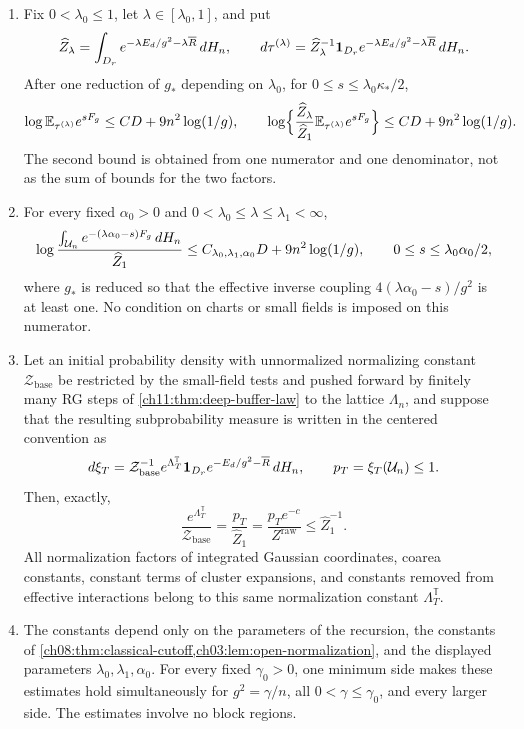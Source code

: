 \begin{theorem}
\begin{enumerate}
\item Fix $0<\lambda_0\le1$, let $\lambda\in[\lambda_0,1]$, and put
\[
 \widehat Z_\lambda=\int_{D_r}e^{-\lambda E_d/g^2-\lambda\overline R}\,dH_n,\qquad
 d\tau^{(\lambda)}=\widehat Z_\lambda^{-1}\mathbf 1_{D_r}e^{-\lambda E_d/g^2-\lambda\overline R}\,dH_n.
\]
After one reduction of $g_*$ depending on $\lambda_0$, for $0\le s\le\lambda_0\kappa_*/2$,
\[
 \log\mathbb E_{\tau^{(\lambda)}}e^{sF_g}\le CD+9n^2\log(1/g),\qquad
 \log\Bigl\{\frac{\widehat Z_\lambda}{\widehat Z_1}\mathbb E_{\tau^{(\lambda)}}e^{sF_g}\Bigr\}\le CD+9n^2\log(1/g).
\]
The second bound is obtained from one numerator and one denominator, not as the sum of bounds for the two factors.
\item For every fixed $\alpha_0>0$ and $0<\lambda_0\le\lambda\le\lambda_1<\infty$,
\[
 \log\frac{\int_{\mathcal U_{n}}e^{-(\lambda\alpha_0-s)F_g}\,dH_n}{\widehat Z_1}
 \le C_{\lambda_0,\lambda_1,\alpha_0}D+9n^2\log(1/g),\qquad0\le s\le\lambda_0\alpha_0/2,
\]
where $g_*$ is reduced so that the effective inverse coupling $4(\lambda\alpha_0-s)/g^2$ is at least one. No condition on charts or small fields is imposed on this numerator.
\item Let an initial probability density with unnormalized normalizing constant $\mathcal Z_{\mathrm{base}}$ be restricted by the small-field tests and pushed forward by finitely many RG steps of \cref{ch11:thm:deep-buffer-law} to the lattice $\Lambda_n$, and suppose that the resulting subprobability measure is written in the centered convention as
\[
 d\xi_T=\mathcal Z_{\mathrm{base}}^{-1}e^{\Lambda_T^{\mathbb T}}\mathbf 1_{D_r}e^{-E_d/g^2-\overline R}\,dH_n,\qquad p_T=\xi_T(\mathcal U_{n})\le1.
\]
Then, exactly,
\[
 \frac{e^{\Lambda_T^{\mathbb T}}}{\mathcal Z_{\mathrm{base}}}=\frac{p_T}{\widehat Z_1}=\frac{p_Te^{-c}}{Z^{\mathrm{raw}}}\le\widehat Z_1^{-1}.
\]
All normalization factors of integrated Gaussian coordinates, coarea constants, constant terms of cluster expansions, and constants removed from effective interactions belong to this same normalization constant $\Lambda_T^{\mathbb T}$.
\item The constants depend only on the parameters of the recursion, the constants of \cref{ch08:thm:classical-cutoff,ch03:lem:open-normalization}, and the displayed parameters $\lambda_0,\lambda_1,\alpha_0$. For every fixed $\gamma_0>0$, one minimum side makes these estimates hold simultaneously for $g^2=\gamma/n$, all $0<\gamma\le\gamma_0$, and every larger side. The estimates involve no block regions.

\end{enumerate}
\end{theorem}

